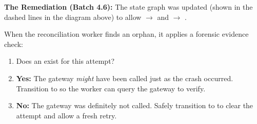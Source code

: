 \textbf{The Remediation (Batch 4.6):}
The state graph was updated (shown in the dashed lines in the diagram above) to allow  $\rightarrow$  and  $\rightarrow$ .

When the reconciliation worker finds an  orphan, it applies a forensic evidence check:
\begin{enumerate}
    \item Does an  exist for this attempt?
    \item \textbf{Yes:} The gateway \textit{might} have been called just as the crash occurred. Transition to  so the worker can query the gateway to verify.
    \item \textbf{No:} The gateway was definitely not called. Safely transition to  to clear the attempt and allow a fresh retry.
\end{enumerate}
